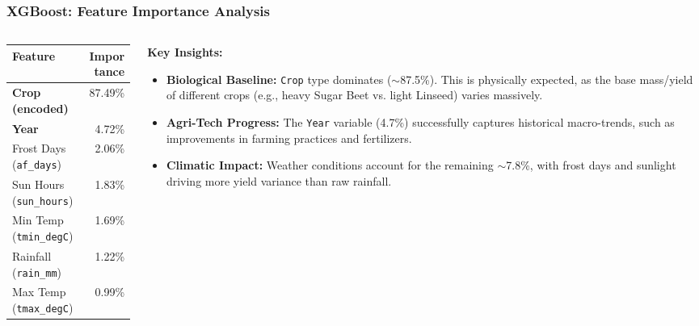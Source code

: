 \documentclass[aspectratio=169]{beamer}
\begin{document}
    \begin{frame}
        \frametitle{XGBoost: Feature Importance Analysis}
        \begin{columns}
            \begin{column}{0.45\textwidth}
                \begin{table}
                    \centering
                    \small
                    \renewcommand{\arraystretch}{1.2}
                    \begin{tabular}{lr}
                        \hline
                        \textbf{Feature} & \textbf{Importance} \\
                        \hline
                        \textbf{Crop (encoded)} & 87.49\% \\
                        \textbf{Year} & 4.72\% \\
                        Frost Days (\texttt{af\_days}) & 2.06\% \\
                        Sun Hours (\texttt{sun\_hours}) & 1.83\% \\
                        Min Temp (\texttt{tmin\_degC}) & 1.69\% \\
                        Rainfall (\texttt{rain\_mm}) & 1.22\% \\
                        Max Temp (\texttt{tmax\_degC}) & 0.99\% \\
                        \hline
                    \end{tabular}
                \end{table}
            \end{column}
            
            \begin{column}{0.55\textwidth}
                \textbf{Key Insights:}
                \begin{itemize}
                    \item \textbf{Biological Baseline:} \texttt{Crop} type dominates ($\sim$87.5\%). This is physically expected, as the base mass/yield of different crops (e.g., heavy Sugar Beet vs. light Linseed) varies massively.
                    \item \textbf{Agri-Tech Progress:} The \texttt{Year} variable (4.7\%) successfully captures historical macro-trends, such as improvements in farming practices and fertilizers.
                    \item \textbf{Climatic Impact:} Weather conditions account for the remaining $\sim$7.8\%, with frost days and sunlight driving more yield variance than raw rainfall.
                \end{itemize}
            \end{column}
        \end{columns}
    \end{frame}
\end{document}
